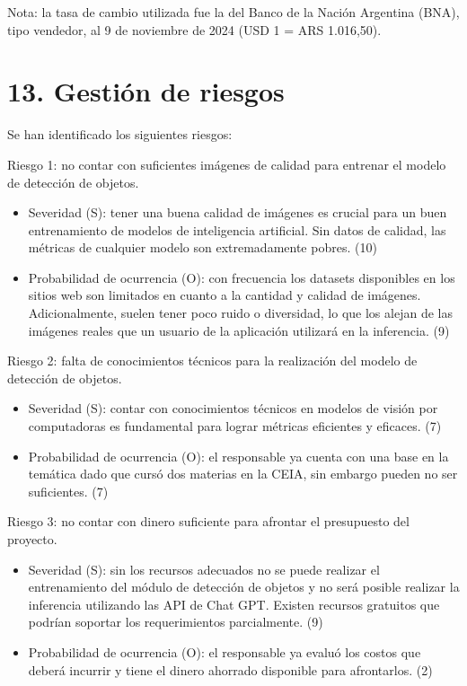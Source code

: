 \documentclass[
11pt, %
]{charter}
\begin{document}
Nota: la tasa de cambio  utilizada fue la del Banco de la Nación Argentina (BNA), tipo vendedor, al 9 de noviembre de 2024 (USD 1 = ARS 1.016,50). 

\section{13. Gestión de riesgos}
\label{sec:riesgos}
Se han identificado los siguientes riesgos: 

Riesgo 1: no contar con suficientes imágenes de calidad para entrenar el modelo de detección de objetos.
\begin{itemize}
\item Severidad (S): tener una buena calidad de imágenes es crucial para un buen entrenamiento de modelos de inteligencia artificial. Sin datos de calidad, las métricas de cualquier modelo son extremadamente pobres. (10)
\item Probabilidad de ocurrencia (O): con frecuencia los datasets disponibles en los sitios web son limitados en cuanto a la cantidad y calidad de imágenes. Adicionalmente, suelen tener poco ruido o diversidad, lo que los alejan de las imágenes reales que un usuario de la aplicación utilizará en la inferencia. (9)
\end{itemize}

Riesgo 2: falta de conocimientos técnicos para la realización del modelo de detección de objetos.
\begin{itemize}
\item Severidad (S): contar con conocimientos técnicos en modelos de visión por computadoras es fundamental para lograr métricas eficientes y eficaces. (7)
\item Probabilidad de ocurrencia (O):  el responsable ya cuenta con una base en la temática dado que cursó dos materias en la CEIA, sin embargo pueden no ser suficientes. (7)
\end{itemize}

Riesgo 3: no contar con dinero suficiente para afrontar el presupuesto del proyecto.
\begin{itemize}
\item Severidad (S): sin los recursos adecuados no se puede realizar el entrenamiento del módulo de detección de objetos y no será posible realizar la inferencia utilizando las API de Chat GPT. Existen recursos gratuitos que podrían soportar los requerimientos parcialmente. (9)
\item Probabilidad de ocurrencia (O): el responsable ya evaluó los costos que deberá incurrir y tiene el dinero ahorrado disponible para afrontarlos. (2)
\end{itemize}
\end{document}
